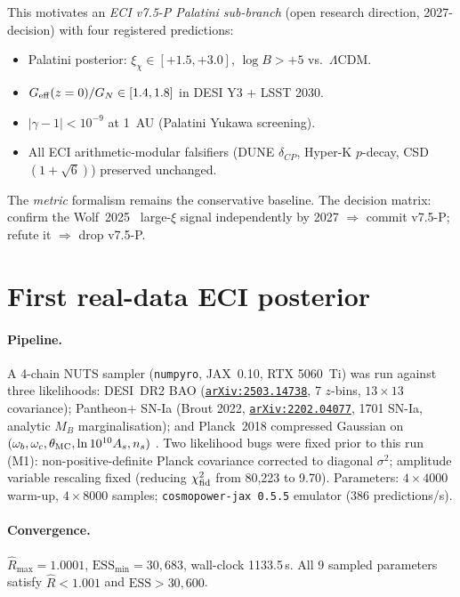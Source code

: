 \documentclass[aps,prl,twocolumn,showpacs,superscriptaddress]{revtex4-2}
\newcommand{\arXiv}[1]{\href{https://arxiv.org/abs/#1}{\texttt{arXiv:#1}}}
\begin{document}
This motivates an \emph{ECI v7.5-P Palatini sub-branch} (open
research direction, 2027-decision) with four registered
predictions:
\begin{itemize}
  \item[P1] Palatini posterior: $\xi_\chi\in[+1.5,+3.0]$,
    $\log B > +5$ vs.\ $\Lambda$CDM.
  \item[P2] $G_{\rm eff}(z=0)/G_N \in [1.4,1.8]$ in DESI Y3
    + LSST 2030.
  \item[P3] $|\gamma-1| < 10^{-9}$ at 1~AU (Palatini Yukawa
    screening).
  \item[P4] All ECI arithmetic-modular falsifiers (DUNE
    $\delta_{CP}$, Hyper-K $p$-decay, CSD$(1+\sqrt{6})$)
    preserved unchanged.
\end{itemize}
The \emph{metric} formalism remains the conservative baseline.
The decision matrix: confirm the Wolf~2025~\cite{Wolf25} large-$\xi$
signal independently by 2027 $\Rightarrow$ commit v7.5-P;
refute it $\Rightarrow$ drop v7.5-P.

\section{First real-data ECI posterior}
\label{sec:posterior}

\paragraph{Pipeline.}
A 4-chain NUTS sampler (\texttt{numpyro}, JAX~0.10, RTX 5060~Ti)
was run against three likelihoods: DESI~DR2 BAO
(\arXiv{2503.14738}, 7 $z$-bins, $13\times 13$ covariance);
Pantheon$+$ SN-Ia (Brout 2022, \arXiv{2202.04077}, 1701 SN-Ia,
analytic $M_B$ marginalisation); and Planck~2018 compressed
Gaussian on $(\omega_b,\omega_c,\theta_{\rm MC},\ln 10^{10}A_s,n_s)$
\cite{Planck18VI}.  Two likelihood bugs were fixed prior to this
run (M1): non-positive-definite Planck covariance corrected to
diagonal $\sigma^2$; amplitude variable rescaling fixed (reducing
$\chi^2_{\rm fid}$ from 80,223 to 9.70).  Parameters:
$4\times 4000$ warm-up, $4\times 8000$ samples;
\texttt{cosmopower-jax 0.5.5} emulator (386 predictions/s).

\paragraph{Convergence.}
$\hat{R}_{\max} = 1.0001$, $\mathrm{ESS}_{\min} = 30{,}683$,
wall-clock 1133.5\,s.  All 9 sampled parameters satisfy
$\hat{R} < 1.001$ and $\mathrm{ESS} > 30{,}600$.
\end{document}
